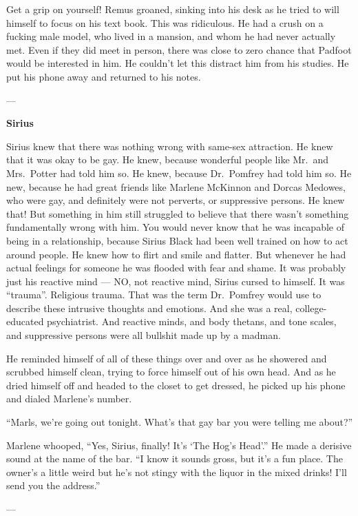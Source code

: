 \documentclass[12pt,twoside,openright]{memoir}
\begin{document}
Get a grip on yourself! Remus groaned, sinking into his desk as he tried to will himself to focus on his text book. This was ridiculous. He had a crush on a fucking male model, who lived in a mansion, and whom he had never actually met. Even if they did meet in person, there was close to zero chance that Padfoot would be interested in him. He couldn't let this distract him from his studies. He put his phone away and returned to his notes.

---

\textbf{Sirius} 

Sirius knew that there was nothing wrong with same-sex attraction. He knew that it was okay to be gay. He knew, because wonderful people like Mr.\ and Mrs.\ Potter had told him so. He knew, because Dr.\ Pomfrey had told him so. He new, because he had great friends like Marlene McKinnon and Dorcas Medowes, who were gay, and definitely were not perverts, or suppressive persons. He knew that! But something in him still struggled to believe that there wasn't something fundamentally wrong with him. You would never know that he was incapable of being in a relationship, because Sirius Black had been well trained on how to act around people. He knew how to flirt and smile and flatter. But whenever he had actual feelings for someone he was flooded with fear and shame. It was probably just his reactive mind --- NO, not reactive mind, Sirius cursed to himself. It was ``trauma''. Religious trauma. That was the term Dr.\ Pomfrey would use to describe these intrusive thoughts and emotions. And she was a real, college-educated psychiatrist. And reactive minds, and body thetans, and tone scales, and suppressive persons were all bullshit made up by a madman.

He reminded himself of all of these things over and over as he showered and scrubbed himself clean, trying to force himself out of his own head. And as he dried himself off and headed to the closet to get dressed, he picked up his phone and dialed Marlene's number.

``Marls, we're going out tonight. What's that gay bar you were telling me about?''

Marlene whooped, ``Yes, Sirius, finally! It's `The Hog's Head'.'' He made a derisive sound at the name of the bar. ``I know it sounds gross, but it's a fun place. The owner's a little weird but he's not stingy with the liquor in the mixed drinks! I'll send you the address.''

---
\end{document}
